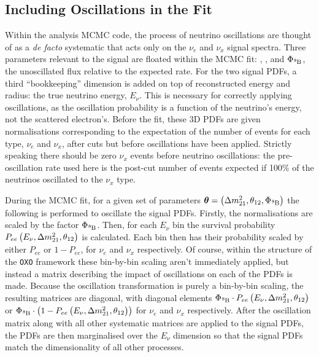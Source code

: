 \subsection{Including Oscillations in the Fit}\label{sec:osc_in_fit}
Within the analysis MCMC code, the process of neutrino oscillations are thought of as a \textit{de facto} systematic that acts only on the \beight{} $\nu_{e}$ and $\nu_{x}$ signal spectra. Three parameters relevant to the signal are floated within the MCMC fit: \dmsq{}, \tonetwo{}, and $\Phi_{\ce{^{8}B}}$, the unoscillated  flux relative to the expected rate. For the two signal PDFs, a third ``bookkeeping'' dimension is added on top of reconstructed energy and radius: the true neutrino energy, $E_{\nu}$. This is necessary for correctly applying oscillations, as the oscillation probability is a function of the neutrino's energy, not the scattered electron's. Before the fit, these 3D PDFs are given normalisations corresponding to the expectation of the number of events for each type, $\nu_{e}$ and $\nu_{x}$, after cuts but before oscillations have been applied. Strictly speaking there should be zero $\nu_{x}$ events before neutrino oscillations: the pre-oscillation rate used here is the post-cut number of events expected if 100\% of the neutrinos oscillated to the $\nu_{x}$ type.

During the MCMC fit, for a given set of parameters $\bm{\theta} = \left(\dmsq{}, \tonetwo{}, \Phi_{\ce{^{8}B}}\right)$ the following is performed to oscillate the signal PDFs. Firstly, the normalisations are scaled by the factor $\Phi_{\ce{^{8}B}}$. Then, for each $E_{\nu}$ bin the survival probability $P_{ee}\left(E_{\nu}, \Delta m^{2}_{21}{}, \theta_{12}{}\right)$ is calculated. Each bin then has their probability scaled by either $P_{ee}$ or $1-P_{ee}$, for $\nu_{e}$ and $\nu_{x}$ respectively. Of course, within the structure of the \texttt{OXO} framework these bin-by-bin scaling aren't immediately applied, but instead a matrix describing the impact of oscillations on each of the PDFs is made. Because the oscillation transformation is purely a bin-by-bin scaling, the resulting matrices are diagonal, with diagonal elements $\Phi_{\ce{^{8}B}}\cdot P_{ee}\left(E_{\nu}, \dmsq{}, \tonetwo{}\right)$ or $\Phi_{\ce{^{8}B}}\cdot\left(1-P_{ee}\left(E_{\nu}, \dmsq{}, \tonetwo{}\right)\right)$ for $\nu_{e}$ and $\nu_{x}$ respectively. After the oscillation matrix along with all other systematic matrices are applied to the signal PDFs, the PDFs are then marginalised over the $E_{\nu}$ dimension so that the signal PDFs match the dimensionality of all other processes.

